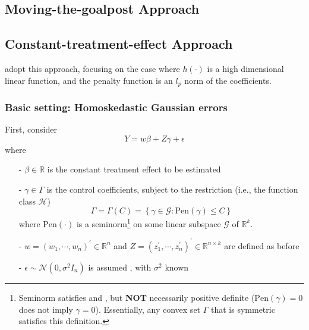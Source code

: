 \documentclass[twoside]{article}
\theoremstyle{definition}
\begin{document}
\subsection{Moving-the-goalpost Approach}

\subsection{Constant-treatment-effect Approach}
\citet{armstrong2020bias} adopt this approach, focusing on the case where $h(\cdot)$ is a high dimensional linear function, and the penalty function is an $l_p$ norm of the coefficients.

\subsubsection*{Basic setting: Homoskedastic Gaussian errors}
First, consider
\begin{equation}
  Y= w \beta + Z\gamma +\epsilon
\end{equation}
where
\begin{itemize}
  \item[-] $\beta\in\mathbb{R}$ is the constant treatment effect to be estimated 
  \item[-] $\gamma \in \Gamma$ is the control coefficients, subject to the restriction (i.e., the function class $\mathcal{H}$)
  \begin{equation}
    \Gamma = \Gamma(C) = \left\{\gamma \in \mathcal{G}:\mathrm{Pen}(\gamma)\leq C \right\}
  \end{equation}
  where $\mathrm{Pen}(\cdot)$ is a seminorm\footnote{Seminorm satisfies
   and , but \textbf{NOT} necessarily positive definite ($\mathrm{Pen}(\gamma)=0$ does not imply $\gamma=0$). Essentially, any convex set $\Gamma$ that is symmetric satisfies this definition.
  } on some linear subspace $\mathcal{G}$ of $\mathbb{R}^k$.
  \item[-] $w= \left(w_1,\cdots,w_n\right)^{\prime}\in\mathbb{R}^n$ and $Z=\left(z_1^{\prime},\cdots,z_n^{\prime}\right)^{\prime}\in\mathbb{R}^{n\times k}$ are defined as before
  \item[-] $\epsilon \sim \mathcal{N}\left(0,\sigma^2 I_n\right)$ is assumed , with $\sigma^2$ known
\end{itemize}
\end{document}
